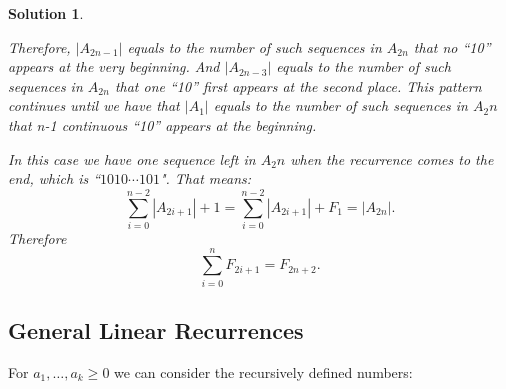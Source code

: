 \documentclass[12pt,a4]{article}
\newtheorem*{solution}{Solution}
\begin{document}
\begin{solution}
\begin{enumerate}
  Therefore, $|A_{2n-1}|$ equals to the number of such sequences in $A_{2n}$ that no ``10'' appears at the very beginning. And $|A_{2n-3}|$ equals to the number of such sequences in $A_{2n}$ that one ``10'' first appears at the second place. This pattern continues until we have that $|A_1|$ equals to the number of such sequences in $A_2n$ that n-1 continuous ``10'' appears at the beginning.
  
     In this case we have one sequence left in $A_2n$ when the recurrence comes to the end, which is ``$1010\cdots101$". That means:
     $$
     \sum_{i=0}^{n-2}|A_{2i+1}|+1=\sum_{i=0}^{n-2}|A_{2i+1}|+F_1=|A_{2n}|.
     $$
  Therefore
     $$
     \sum_{i=0}^{n}F_{2i+1}=F_{2n+2}.
     $$
   \end{enumerate}
\end{solution}

\subsection{General Linear Recurrences}

For $a_1,\dots,a_k \geq 0$ we can consider the recursively defined numbers:
\end{document}
